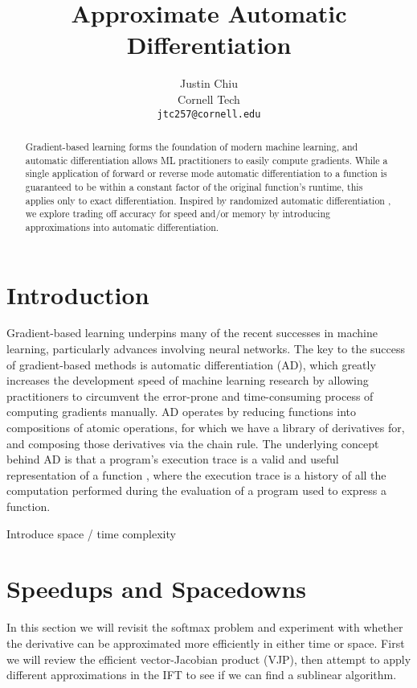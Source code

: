 \documentclass[11pt]{article}
\title{Approximate Automatic Differentiation}
\author{Justin Chiu \\
  Cornell Tech \\
  \texttt{jtc257@cornell.edu}}
\begin{document}
\maketitle
\begin{abstract}
Gradient-based learning forms the foundation of modern machine learning,
and automatic differentiation allows ML practitioners to easily compute gradients.
While a single application of forward or reverse mode automatic differentiation
to a function is guaranteed to be within a constant factor of the original
function's runtime, this applies only to exact differentiation.
Inspired by randomized automatic differentiation \citep{rad},
we explore trading off accuracy for speed and/or memory by introducing
approximations into automatic differentiation.
\end{abstract}

\section{Introduction}
\label{sec:intro}
Gradient-based learning underpins many of the recent successes in machine learning,
particularly advances involving neural networks.
The key to the success of gradient-based methods is automatic differentiation (AD),
which greatly increases the development speed of machine learning research by
allowing practitioners to circumvent the error-prone and time-consuming process
of computing gradients manually.
AD operates by reducing functions into compositions of atomic operations,
for which we have a library of derivatives for,
and composing those derivatives via the chain rule.
The underlying concept behind AD is that a program's execution trace is a valid
and useful representation of a function \citep{griewank2008autodiff},
where the execution trace is a history of all the computation performed
during the evaluation of a program used to express a function.

{\color{red} Introduce space / time complexity}

\section{Speedups and Spacedowns}
In this section we will revisit the softmax problem and experiment with
whether the derivative can be approximated more efficiently in either time or space.
First we will review the efficient vector-Jacobian product (VJP),
then attempt to apply different approximations in the IFT to see if we can
find a sublinear algorithm.
\end{document}
